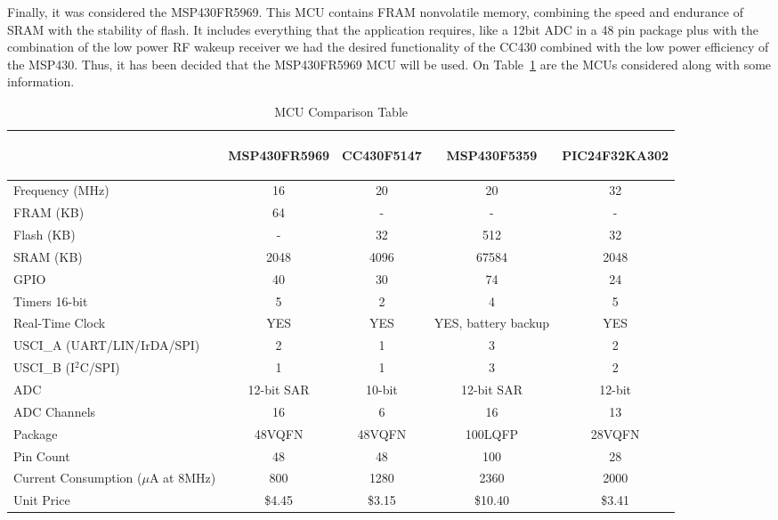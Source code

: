 Finally, it was considered the MSP430FR5969. This MCU contains FRAM nonvolatile memory, combining the speed and endurance of SRAM with the stability of flash. It includes everything that the application requires, like a 12bit ADC in a 48 pin package plus with the combination of the low power RF wakeup receiver we had the desired functionality of the CC430 combined with the low power efficiency of the MSP430. Thus, it has been decided that the MSP430FR5969 MCU will be used. On Table~\ref{tab:mcuComp} are the MCUs considered along with some information.
\begin{table}[H]
\setlength{\extrarowheight}{1.5pt}
  \centering
  \caption{MCU Comparison Table}
    \begin{tabular}{|m{1.5in}|c|c|c|c|}
    \cline{2-5}
    \multicolumn{1}{c|}{} & \begin{sideways}MSP430FR5969 \end{sideways} &\begin{sideways} CC430F5147 \end{sideways}& \begin{sideways}MSP430F5359 \end{sideways}& \begin{sideways}PIC24F32KA302\end{sideways}\\ 
    \hline
    Frequency (MHz) & 16    & 20    & 20    & 32\\ \hline
    FRAM (KB) & 64    & -     & -     & -\\ \hline
    Flash (KB) & -     & 32    & 512   & 32\\ \hline
    SRAM (KB) & 2048  & 4096  & 67584 & 2048 \\ \hline
    GPIO  & 40    & 30    & 74    & 24    \\ \hline
    Timers 16-bit & 5     & 2     & 4     & 5     \\ \hline
    Real-Time Clock & YES   & YES   & YES, battery backup & YES   \\ \hline
    USCI\_A (UART/LIN/IrDA/SPI) & 2     & 1     & 3     & 2     \\ \hline
    USCI\_B (I$^2$C/SPI) & 1     & 1     & 3     & 2     \\ \hline
    ADC   & 12-bit SAR & 10-bit & 12-bit SAR & 12-bit \\ \hline
    ADC Channels & 16    & 6     & 16    & 13    \\ \hline
    Package & 48VQFN & 48VQFN & 100LQFP & 28VQFN \\ \hline
    Pin Count & 48    & 48    & 100   & 28    \\ \hline
    Current Consumption ($\mu$A at 8MHz) & 800   & 1280  & 2360  & 2000  \\ \hline
    Unit Price & \$4.45  & \$3.15  & \$10.40 & \$3.41  \\ \hline
    \end{tabular}%
  \label{tab:mcuComp}%
\end{table}%
